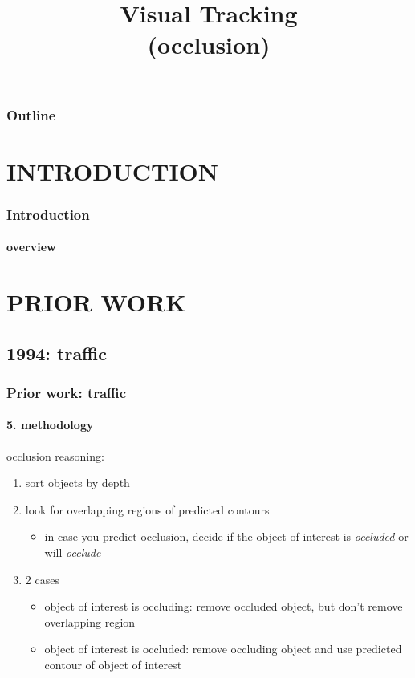 
\title{Visual Tracking \\ (occlusion)}
\begin{frame}[plain]\logoTechTower
	\titlepage
\end{frame}

\begin{frame}
\frametitle{Outline}
\logoCSIPCPL\logoTechTower
	\setcounter{tocdepth}{1}	
	\tableofcontents
\end{frame}

\section{INTRODUCTION}
\begin{frame}
\frametitle{Introduction}
\framesubtitle{overview}
\logoCSIPCPL\mypagenum
\end{frame}

\section{PRIOR WORK}
\subsection{1994: traffic}
\begin{frame}
\frametitle{Prior work: traffic}
\framesubtitle{5. methodology}
\logoCSIPCPL\mypagenum
{}
	occlusion reasoning:
	\begin{enumerate}
		\item sort objects by depth
		\item look for overlapping regions of predicted contours
			\begin{itemize}
				\item in case you predict occlusion, decide if the object of interest is \emph{occluded} or will \emph{occlude}
			\end{itemize}
		\item 2 cases
			\begin{itemize}
				\item object of interest is occluding: remove occluded object, but don't remove overlapping region
				\item object of interest is occluded: remove occluding object and use predicted contour of object of interest
			\end{itemize}
	\end{enumerate}
\end{frame}



